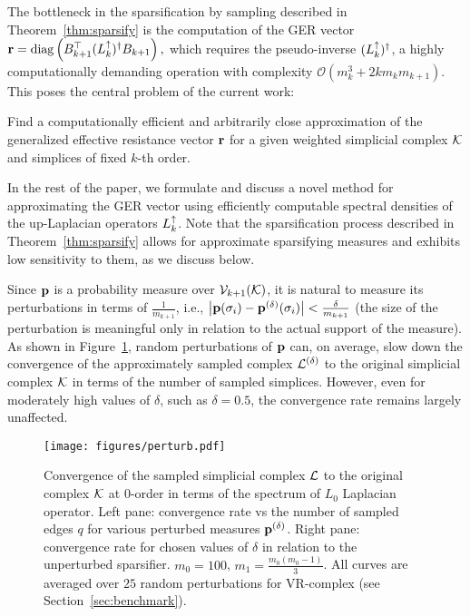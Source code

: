 The bottleneck in the sparsification by sampling described in Theorem~\ref{thm:sparsify} is the computation of the GER vector 
\(
\mathbf{r} =  \operatorname{diag} \left( B_{k+1}^\top ( L_{k}^{\uparrow} )^\dagger B_{k+1} \right),
\)
which requires the pseudo-inverse \( ( L_{k}^{\uparrow} )^\dagger \), a highly computationally demanding operation with complexity \( \mathcal{O}( m_k^3 + 2 k m_k m_{k+1} ) \). This poses the central problem of the current work:

\begin{problem}
      Find a computationally efficient and arbitrarily close approximation of the generalized effective resistance vector \( \mathbf{r} \) for a given weighted simplicial complex \( \mathcal{K} \) and simplices of fixed \( k \)-th order.
\end{problem}

In the rest of the paper, we formulate and discuss a novel method for approximating the GER vector using efficiently computable spectral densities of the up-Laplacian operators \( L_{k}^{\uparrow} \). Note that the sparsification process described in Theorem~\ref{thm:sparsify} allows for approximate sparsifying measures and exhibits low sensitivity to them, as we discuss below.

\begin{remark}
      Since \( \mathbf{p} \) is a probability measure over \( \mathcal{V}_{k+1}(\mathcal{K}) \), it is natural to measure its perturbations in terms of \( \frac{1}{m_{k+1}} \), i.e., 
      \(
      \left| \mathbf{p} (\sigma_i) - \mathbf{p}^{(\delta)}(\sigma_i) \right|< \frac{\delta}{m_{k+1}}
      \)
      (the size of the perturbation is meaningful only in relation to the actual support of the measure). As shown in Figure~\ref{fig:perturb_measure}, random perturbations of \( \mathbf{p} \) can, on average, slow down the convergence of the approximately sampled complex \( \mathcal{L}^{(\delta)} \) to the original simplicial complex \( \mathcal{K} \) in terms of the number of sampled simplices. However, even for moderately high values of \( \delta \), such as \( \delta = 0.5 \), the convergence rate remains largely unaffected.
\end{remark}

\begin{figure}[t]
      \centering
      \vspace{-10pt}
      \texttt{[image: figures/perturb.pdf]}
      \caption{ Convergence of the sampled simplicial complex \( \mathcal{L} \) to the original complex \( \mathcal{K} \) at \(0\)-order in terms of the spectrum of \( L_0 \) Laplacian operator. Left pane: convergence rate vs the number of sampled edges \( q \) for various perturbed measures \( \mathbf{p}^{(\delta)}\). Right pane: convergence rate for chosen values of \( \delta \) in relation to the unperturbed sparsifier. \( m_0 = 100 \), \( m_1 = \frac{m_0(m_0-1)}{3}\). All curves are averaged over \( 25 \) random perturbations for VR-complex (see Section~\ref{sec:benchmark}). \label{fig:perturb_measure}}
\end{figure}






